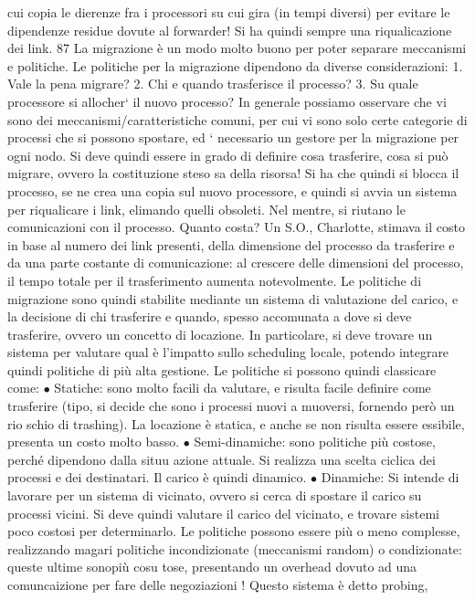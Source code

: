 cui copia le dierenze fra i processori su cui gira (in tempi diversi) per evitare
le dipendenze residue dovute al forwarder! Si ha quindi sempre una riqualicazione dei link.
87
La migrazione è un modo molto buono per poter separare meccanismi e
politiche. Le politiche per la migrazione dipendono da diverse considerazioni:
1. Vale la pena migrare?
2. Chi e quando trasferisce il processo?
3. Su quale processore si allocher` il nuovo processo?
In generale possiamo osservare che vi sono dei meccanismi/caratteristiche comuni, per cui vi sono solo certe categorie
di processi che si possono spostare, ed
` necessario un gestore per la migrazione per ogni nodo. Si deve quindi essere in
grado di definire cosa trasferire, cosa si può migrare, ovvero la costituzione steso
sa della risorsa! Si ha che quindi si blocca il processo, se ne crea una copia sul
nuovo processore, e quindi si avvia un sistema per riqualicare i link, elimando
quelli obsoleti. Nel mentre, si riutano le comunicazioni con il processo.
Quanto costa? Un S.O., Charlotte, stimava il costo in base al numero dei
link presenti, della dimensione del processo da trasferire e da una parte costante
di comunicazione: al crescere delle dimensioni del processo, il tempo totale per
il trasferimento aumenta notevolmente.
Le politiche di migrazione sono quindi stabilite mediante un sistema di valutazione del carico, e la decisione di chi
trasferire e quando, spesso accomunata
a dove si deve trasferire, ovvero un concetto di locazione. In particolare, si deve
trovare un sistema per valutare qual è l'impatto sullo scheduling locale, potendo
integrare quindi politiche di più alta gestione. Le politiche si possono quindi
classicare come:
$\bullet$ Statiche: sono molto facili da valutare, e risulta facile definire come trasferire
(tipo, si decide che sono i processi nuovi a muoversi, fornendo però un rio
schio di trashing). La locazione è statica, e anche se non risulta essere
essibile, presenta un costo molto basso.
$\bullet$ Semi-dinamiche: sono politiche più costose, perché dipendono dalla situu
azione attuale. Si realizza una scelta ciclica dei processi e dei destinatari.
Il carico è quindi dinamico.
$\bullet$ Dinamiche: Si intende di lavorare per un sistema di vicinato, ovvero si
cerca di spostare il carico su processi vicini. Si deve quindi valutare il
carico del vicinato, e trovare sistemi poco costosi per determinarlo.
Le politiche possono essere più o meno complesse, realizzando magari politiche
incondizionate (meccanismi random) o condizionate: queste ultime sonopiù cosu
tose, presentando un overhead dovuto ad una comuncaizione per fare delle negoziazioni ! Questo sistema è detto probing,
